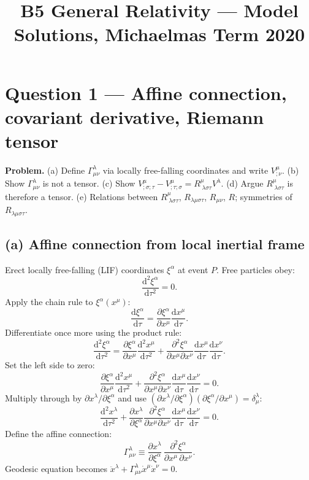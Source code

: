 \documentclass[11pt]{article}
\title{B5 General Relativity --- Model Solutions, Michaelmas Term 2020}
\author{}
\date{}
\newcommand{\de}{\mathrm{d}}
\newcommand{\pd}[2]{\frac{\partial #1}{\partial #2}}
\begin{document}
\maketitle

\section*{Question 1 --- Affine connection, covariant derivative, Riemann tensor}

\textbf{Problem.} (a) Define $\Gamma^\lambda_{\mu\nu}$ via locally free-falling coordinates and write $V^\mu_{;\nu}$. (b) Show $\Gamma^\lambda_{\mu\nu}$ is not a tensor. (c) Show $V^\mu_{;\sigma;\tau}-V^\mu_{;\tau;\sigma}=R^\mu_{\;\lambda\sigma\tau}V^\lambda$. (d) Argue $R^\mu_{\;\lambda\sigma\tau}$ is therefore a tensor. (e) Relations between $R^\mu_{\;\lambda\sigma\tau}$, $R_{\lambda\mu\sigma\tau}$, $R_{\mu\nu}$, $R$; symmetries of $R_{\lambda\mu\sigma\tau}$.

\subsection*{(a) Affine connection from local inertial frame}

Erect locally free-falling (LIF) coordinates $\xi^\alpha$ at event $P$. Free particles obey:
\[ \frac{\de^2 \xi^\alpha}{\de\tau^2} = 0. \]
Apply the chain rule to $\xi^\alpha(x^\mu)$:
\[ \frac{\de \xi^\alpha}{\de\tau} = \pd{\xi^\alpha}{x^\mu}\frac{\de x^\mu}{\de\tau}. \]
Differentiate once more using the product rule:
\[ \frac{\de^2 \xi^\alpha}{\de\tau^2} = \pd{\xi^\alpha}{x^\mu}\frac{\de^2 x^\mu}{\de\tau^2} + \frac{\partial^2 \xi^\alpha}{\partial x^\mu \partial x^\nu}\frac{\de x^\mu}{\de\tau}\frac{\de x^\nu}{\de\tau}. \]
Set the left side to zero:
\[ \pd{\xi^\alpha}{x^\mu}\frac{\de^2 x^\mu}{\de\tau^2} + \frac{\partial^2 \xi^\alpha}{\partial x^\mu \partial x^\nu}\frac{\de x^\mu}{\de\tau}\frac{\de x^\nu}{\de\tau} = 0. \]
Multiply through by $\partial x^\lambda/\partial \xi^\alpha$ and use $(\partial x^\lambda/\partial\xi^\alpha)(\partial\xi^\alpha/\partial x^\mu) = \delta^\lambda_\mu$:
\[ \frac{\de^2 x^\lambda}{\de\tau^2} + \pd{x^\lambda}{\xi^\alpha}\frac{\partial^2 \xi^\alpha}{\partial x^\mu\partial x^\nu}\frac{\de x^\mu}{\de\tau}\frac{\de x^\nu}{\de\tau} = 0. \]
Define the affine connection:
\begin{equation}
\boxed{\;\Gamma^\lambda_{\mu\nu} \equiv \pd{x^\lambda}{\xi^\alpha}\,\frac{\partial^2 \xi^\alpha}{\partial x^\mu\,\partial x^\nu}.\;}
\label{eq:gamma-def}
\end{equation}
Geodesic equation becomes $\ddot x^\lambda + \Gamma^\lambda_{\mu\nu}\dot x^\mu \dot x^\nu = 0$.
\end{document}

